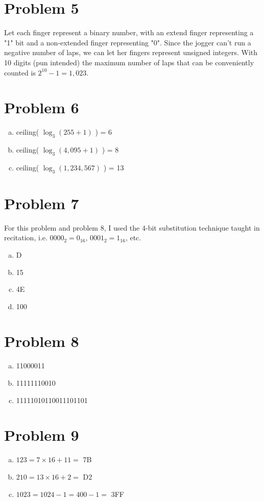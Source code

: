 \documentclass[11pt]{article}
\begin{document}
\section*{Problem 5}
Let each finger represent a binary number, with an extend finger representing a "1" bit and a non-extended finger representing "0". Since the jogger can't run a negative number of laps, we can let her fingers represent unsigned integers. With 10 digits (pun intended) the maximum number of laps that can be conveniently counted is $2^{10} -1 = 1,023$.

\section*{Problem 6}
\begin{enumerate}[(a)]
	\item ceiling( $\log _3 (255+1)$ ) = 6
	\item ceiling( $\log _3 (4,095+1)$ ) = 8
	\item ceiling( $\log _3 (1,234,567)$ ) = 13
\end{enumerate}

\section*{Problem 7}
For this problem and problem 8, I used the 4-bit substitution technique taught in recitation, i.e. $0000_2 = 0_{16}$, $0001_2 = 1_{16}$, etc.
\begin{enumerate}[(a)]
	\item D
	\item 15
	\item 4E
	\item 100
\end{enumerate}

\section*{Problem 8}
\begin{enumerate}[(a)]
	\item 11000011
	\item 11111110010
	\item 11111010110011101101
\end{enumerate}

\section*{Problem 9}
\begin{enumerate}[(a)]
	\item $123 = 7 \times 16 + 11 =$ 7B
	\item $210 = 13 \times 16 + 2 =$ D2
	\item $1023 = 1024 -1 = 400-1 = $ 3FF
\end{enumerate}
\end{document}
